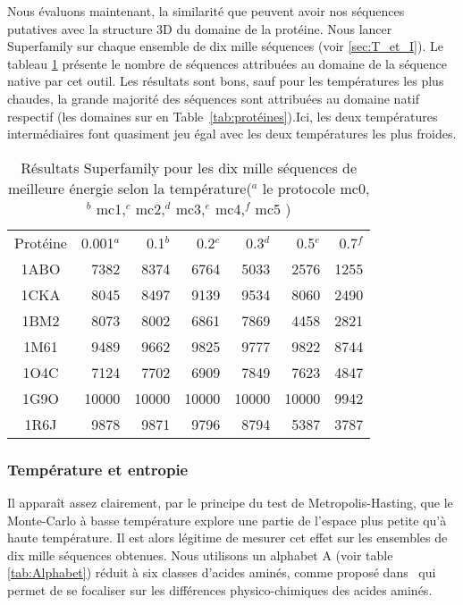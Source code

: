 Nous évaluons maintenant, la similarité que peuvent avoir nos séquences putatives avec la structure 3D du domaine de la protéine. Nous lancer Superfamily sur chaque ensemble de dix mille séquences (voir \ref{sec:T_et_I}). Le tableau \ref{tab:SF_mc} présente le nombre de séquences attribuées au domaine de la séquence native par cet outil. Les résultats sont bons, sauf pour les températures les plus chaudes, la grande majorité des séquences sont attribuées au domaine natif respectif (les domaines sur en Table~\ref{tab:protéines}).Ici, les deux températures intermédiaires font quasiment jeu égal avec les deux températures les plus froides.
    \begin{table}[!htbp]
      \centering
      
      \begin{tabular}{crrrrrr}      
        \toprule
         Protéine & 0.001$^a$ & 0.1$^b$ & 0.2$^c$  & 0.3$^d$ & 0.5$^e$ & 0.7$^f$  \\
        \cmidrule{1-7}
        1ABO & 7382  & 8374 & 6764 & 5033 & 2576  & 1255  \\      
        1CKA & 8045  & 8497 & 9139 & 9534 & 8060  & 2490  \\  
        1BM2 & 8073  & 8002 & 6861 & 7869 & 4458  & 2821  \\  
        1M61 & 9489  & 9662 & 9825 & 9777 & 9822  & 8744  \\  
        1O4C & 7124  & 7702 & 6909 & 7849 & 7623  & 4847  \\  
        1G9O & 10000 & 10000 & 10000 & 10000 & 10000  & 9942 \\  
        1R6J & 9878  & 9871 & 9796 & 8794 & 5387 & 3787 \\  

        \bottomrule
        
      \end{tabular}
      

      \caption{Résultats Superfamily pour les dix mille séquences de meilleure énergie selon la température($^a$ le protocole mc0,$^b$ mc1,$^c$  mc2,$^d$ mc3,$^e$ mc4,$^f$ mc5 )}      
      \label{tab:SF_mc}
    \end{table}



   \subsubsection{Température et entropie} 

Il apparaît assez clairement, par le principe du test de Metropolis-Hasting, que le Monte-Carlo à basse température explore une partie de l'espace plus petite qu'à haute température. Il est alors légitime de mesurer cet effet sur les ensembles de dix mille séquences obtenues. Nous utilisons un alphabet A (voir table \ref{tab:Alphabet}) réduit à six classes d'acides aminés, comme proposé dans~\citep{refAlphabet} qui permet de se focaliser sur les différences physico-chimiques des acides aminés.  

